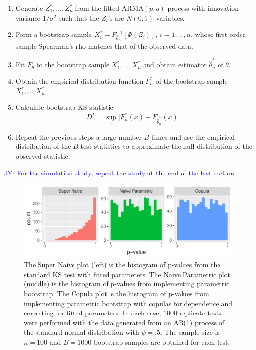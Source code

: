 \documentclass[12pt, letterpaper, titlepage]{article}
\newcommand{\jy}[1]{\textcolor{blue}{JY: #1}}
\begin{document}
\begin{enumerate}
\item
  Generate $Z_1^*, \ldots, Z_n^*$ from the fitted ARMA$(p, q)$ process
  with innovation variance $1 / \sigma^2$ such that the $Z_i$'s are $N(0, 1)$ variables.
\item
  Form a bootstrap sample $X_i^* = F^{-1}_{\hat\theta_n} [\Phi(Z_i)]$,
  $i = 1, \ldots, n$, whose first-order sample Spearman's rho matches that of
  the observed data.
\item
  Fit $F_\theta$ to the bootstrap sample $X_1^*, \ldots, X_n^*$ and obtain estimator
  $\hat\theta_n^*$ of $\theta$.
\item
  Obtain the empirical distribution function $F_n^*$ of the bootstrap sample
  $X_1^*, \ldots, X_n^*$.
\item
  Calculate bootstrap KS statistic
  \[
    D^* = \sup_x \lvert F_n^* (x)- F_{\hat\theta_n^*}(x) \rvert.
  \]
\item
  Repeat the previous steps a large number $B$ times and use the empirical
  distribution of the $B$ test statistics to approximate
  the null distribution of the observed statistic.
\end{enumerate}

\jy{For the simulation study, repeat the study at the end of the last section.}  

\begin{figure}[tbp]
  \centering
  \includegraphics[width=\textwidth]{hist_ar1_FD}
  \caption{The Super Naive plot (left) is the histogram of p-values from the
  standard KS test with fitted parameters. The Naive Parametric plot (middle) is
  the histogram of p-values from implementing parametric bootstrap. The Copula
  plot is the histogram of p-values from implementing parametric bootstrap with
  copulas for dependence and correcting for fitted parameters. In each case,
  $1000$ replicate tests were performed with the data generated from an AR(1)
  process of the standard normal distribution with $\psi = .5$. The sample size
  is $n = 100$ and $B = 1000$ bootstrap samples are obtained for each test.}
  \label{fig:hist_ar1_FD}
\end{figure}
\end{document}
